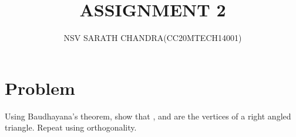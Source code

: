 \documentclass[journal,12pt,twocolumn]{IEEEtran}
\begin{document}
\title{ASSIGNMENT 2}
\author{NSV SARATH CHANDRA(CC20MTECH14001)}
\maketitle
\newpage
\bigskip
\renewcommand{\thefigure}{\theenumi}
\renewcommand{\thetable}{\theenumi}

    
\section{Problem}
Using Baudhayana's theorem, show that ,  and  are the vertices of a right angled triangle. Repeat using orthogonality.  





\end{document}
